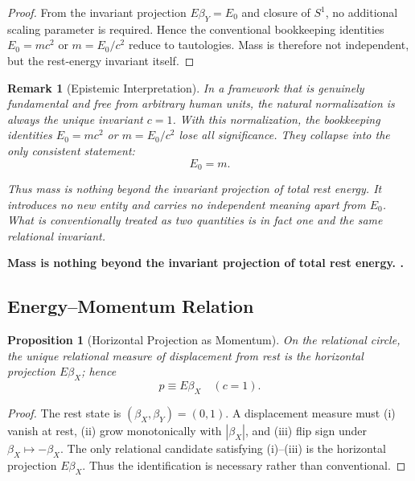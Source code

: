 \documentclass[12pt, a4paper]{article}
\newtheorem{proposition}[theorem]{Proposition}
\newtheorem{remark}[theorem]{Remark}
\begin{document}
\begin{proof}
From the invariant projection $E\beta_Y = E_0$ and closure of $S^1$, no additional scaling parameter is required. 
Hence the conventional bookkeeping identities $E_0 = mc^2$ or $m = E_0/c^2$ reduce to tautologies. 
Mass is therefore not independent, but the rest-energy invariant itself.  
\end{proof}

\begin{remark}[Epistemic Interpretation]
In a framework that is genuinely fundamental and free from arbitrary human units, 
the natural normalization is always the unique invariant $c=1$. 
With this normalization, the bookkeeping identities $E_0=mc^2$ or $m=E_0/c^2$ lose all significance. 
They collapse into the only consistent statement:
\[
E_{0} = m.
\]

Thus mass is nothing beyond the invariant projection of total rest energy. 
It introduces no new entity and carries no independent meaning apart from $E_0$. 
What is conventionally treated as two quantities is in fact one and the same relational invariant.
\end{remark}

\begin{tcolorbox}[colback=gray!5, colframe=black!80!black, title=Summary:]
\textbf{Mass is nothing beyond the invariant projection of total rest energy. .}
\end{tcolorbox}

\subsection{Energy--Momentum Relation}

\begin{proposition}[Horizontal Projection as Momentum]
\label{prop:momentum}
On the relational circle, the unique relational measure of displacement from rest is the horizontal projection $E\beta_X$; hence
\[
p \equiv E\beta_X \quad (c=1).
\]
\end{proposition}

\begin{proof}
The rest state is $(\beta_X,\beta_Y)=(0,1)$. A displacement measure must (i) vanish at rest, (ii) grow monotonically with $|\beta_X|$, and (iii) flip sign under $\beta_X\mapsto -\beta_X$. The only relational candidate satisfying (i)–(iii) is the horizontal projection $E\beta_X$. Thus the identification is necessary rather than conventional.  
\end{proof}
\end{document}
